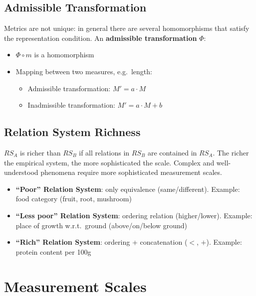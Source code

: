 \subsection{Admissible Transformation}

Metrics are not unique: in general there are several homomorphisms that satisfy the
representation condition. An \textbf{admissible transformation} $\Phi$:
\begin{itemize}
  \item $\Phi \circ m$ is a homomorphism
  \item Mapping between two measures, e.g.\ length:
        \begin{itemize}
          \item Admissible transformation: $M' = a \cdot M$
          \item Inadmissible transformation: $M' = a \cdot M + b$
        \end{itemize}
\end{itemize}

\subsection{Relation System Richness}

$RS_A$ is richer than $RS_B$ if all relations in $RS_B$ are contained in $RS_A$.
The richer the empirical system, the more sophisticated the scale.
Complex and well-understood phenomena require more sophisticated measurement scales.

\begin{itemize}
  \item \textbf{``Poor'' Relation System}: only equivalence (same/different). Example: food
        category (fruit, root, mushroom)
  \item \textbf{``Less poor'' Relation System}: ordering relation (higher/lower). Example:
        place of growth w.r.t.\ ground (above/on/below ground)
  \item \textbf{``Rich'' Relation System}: ordering + concatenation ($<$, $+$). Example:
        protein content per 100g
\end{itemize}

\section{Measurement Scales}

